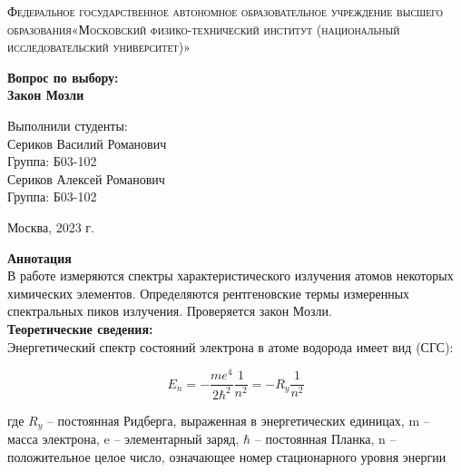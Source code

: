 \documentclass[a4paper, 12pt]{article}%
\begin{document}
	\begin{titlepage}
		\begin{center}
			\textsc{Федеральное государственное автономное образовательное учреждение высшего образования«Московский физико-технический институт (национальный исследовательский университет)»\\[5mm]
			}
			
			\vfill
			
			\textbf{Вопрос по выбору: \\[3mm]
				Закон Мозли
				\\[50mm]
			}
			
		\end{center}
		
		\hfill
		\begin{minipage}{.5\textwidth}
			Выполнили студенты:\\[2mm]
			Сериков Василий Романович\\[2mm]
			Группа: Б03-102\\[5mm]
			Сериков Алексей Романович\\[2mm]
			Группа: Б03-102\\[5mm]
			
		\end{minipage}
		\vfill
		\begin{center}
			Москва, 2023 г.
		\end{center}
		
	\end{titlepage}
	
	\newpage
	\textbf{Аннотация}\\
	
	В работе измеряются спектры характеристического излучения
	атомов некоторых химических элементов. Определяются рентгеновские
	термы измеренных спектральных пиков излучения. Проверяется закон Мозли.\\
	
	\textbf{Теоретические сведения: }\\
	
	Энергетический спектр состояний электрона в
	атоме водорода имеет вид (СГС):
	
	\begin{equation}
		E_n=-\frac{m e^4}{2 \hbar^2} \frac{1}{n^2}=-R_y \frac{1}{n^2}
	\end{equation}
	
	где $R_y$ – постоянная Ридберга, выраженная в энергетических единицах, m – масса электрона, e – элементарный заряд, $\hbar$ – постоянная
	Планка, n – положительное целое число, означающее номер стационарного уровня энергии
	
\end{document}
